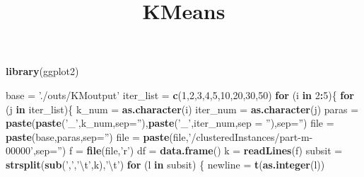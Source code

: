 \documentclass[]{article}
\title{KMeans}
\author{}
\date{}
\newenvironment{Shaded}{\begin{snugshade}}{\end{snugshade}}
\newcommand{\CharTok}[1]{\textcolor[rgb]{0.31,0.60,0.02}{#1}}
\newcommand{\ControlFlowTok}[1]{\textcolor[rgb]{0.13,0.29,0.53}{\textbf{#1}}}
\newcommand{\DataTypeTok}[1]{\textcolor[rgb]{0.13,0.29,0.53}{#1}}
\newcommand{\DecValTok}[1]{\textcolor[rgb]{0.00,0.00,0.81}{#1}}
\newcommand{\KeywordTok}[1]{\textcolor[rgb]{0.13,0.29,0.53}{\textbf{#1}}}
\newcommand{\NormalTok}[1]{#1}
\newcommand{\OperatorTok}[1]{\textcolor[rgb]{0.81,0.36,0.00}{\textbf{#1}}}
\newcommand{\StringTok}[1]{\textcolor[rgb]{0.31,0.60,0.02}{#1}}
\begin{document}
\maketitle

\begin{Shaded}
\begin{Highlighting}[]
\KeywordTok{library}\NormalTok{(ggplot2)}
\end{Highlighting}
\end{Shaded}

\begin{Shaded}
\begin{Highlighting}[]
\NormalTok{base =}\StringTok{ './outs/KMoutput'}
\NormalTok{iter_list =}\StringTok{ }\KeywordTok{c}\NormalTok{(}\DecValTok{1}\NormalTok{,}\DecValTok{2}\NormalTok{,}\DecValTok{3}\NormalTok{,}\DecValTok{4}\NormalTok{,}\DecValTok{5}\NormalTok{,}\DecValTok{10}\NormalTok{,}\DecValTok{20}\NormalTok{,}\DecValTok{30}\NormalTok{,}\DecValTok{50}\NormalTok{)}
\ControlFlowTok{for}\NormalTok{ (i }\ControlFlowTok{in} \DecValTok{2}\OperatorTok{:}\DecValTok{5}\NormalTok{)\{}
  \ControlFlowTok{for}\NormalTok{ (j }\ControlFlowTok{in}\NormalTok{ iter_list)\{}
\NormalTok{    k_num =}\StringTok{ }\KeywordTok{as.character}\NormalTok{(i)}
\NormalTok{    iter_num =}\StringTok{ }\KeywordTok{as.character}\NormalTok{(j)}
\NormalTok{    paras =}\StringTok{ }\KeywordTok{paste}\NormalTok{(}\KeywordTok{paste}\NormalTok{(}\StringTok{'_'}\NormalTok{,k_num,}\DataTypeTok{sep=}\StringTok{''}\NormalTok{),}\KeywordTok{paste}\NormalTok{(}\StringTok{'_'}\NormalTok{,iter_num,}\DataTypeTok{sep =} \StringTok{''}\NormalTok{),}\DataTypeTok{sep=}\StringTok{''}\NormalTok{)}
\NormalTok{    file =}\StringTok{ }\KeywordTok{paste}\NormalTok{(base,paras,}\DataTypeTok{sep=}\StringTok{''}\NormalTok{)}
\NormalTok{    file =}\StringTok{ }\KeywordTok{paste}\NormalTok{(file,}\StringTok{'/clusteredInstances/part-m-00000'}\NormalTok{,}\DataTypeTok{sep=}\StringTok{''}\NormalTok{)}
\NormalTok{    f =}\StringTok{ }\KeywordTok{file}\NormalTok{(file,}\StringTok{'r'}\NormalTok{)}
\NormalTok{    df =}\StringTok{ }\KeywordTok{data.frame}\NormalTok{()}
\NormalTok{    k =}\StringTok{ }\KeywordTok{readLines}\NormalTok{(f)}
\NormalTok{    subsit =}\StringTok{ }\KeywordTok{strsplit}\NormalTok{(}\KeywordTok{sub}\NormalTok{(}\StringTok{','}\NormalTok{,}\StringTok{'}\CharTok{\textbackslash{}t}\StringTok{'}\NormalTok{,k),}\StringTok{'}\CharTok{\textbackslash{}t}\StringTok{'}\NormalTok{)}
    \ControlFlowTok{for}\NormalTok{ (l }\ControlFlowTok{in}\NormalTok{ subsit) \{}
\NormalTok{      newline =}\StringTok{ }\KeywordTok{t}\NormalTok{(}\KeywordTok{as.integer}\NormalTok{(l))}

\end{Highlighting}
\end{Shaded}
\end{document}
